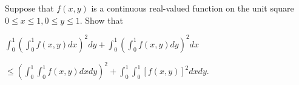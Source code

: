 Suppose that $f(x,y)$ is a continuous real-valued function on the unit square $0\le x\le1,0\le y\le1.$ Show that

$\int_0^1\left(\int_0^1f(x,y)dx\right)^2dy + \int_0^1\left(\int_0^1f(x,y)dy\right)^2dx$

$\le\left(\int_0^1\int_0^1f(x,y)dxdy\right)^2 + \int_0^1\int_0^1\left[f(x,y)\right]^2dxdy.$